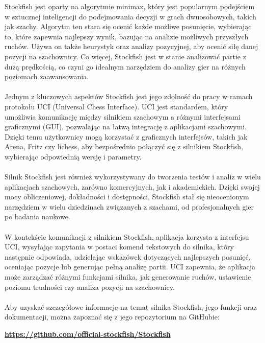 \documentclass[12pt,a4paper]{article}
\begin{document}
Stockfish jest oparty na algorytmie minimax, który jest popularnym podejściem w sztucznej inteligencji do podejmowania decyzji w grach dwuosobowych, takich jak szachy. Algorytm ten stara się ocenić każde możliwe posunięcie, wybierając to, które zapewnia najlepszy wynik, bazując na analizie możliwych przyszłych ruchów. Używa on także heurystyk oraz analizy pozycyjnej, aby ocenić siłę danej pozycji na szachownicy. Co więcej, Stockfish jest w stanie analizować partie z dużą prędkością, co czyni go idealnym narzędziem do analizy gier na różnych poziomach zaawansowania.
\\\\
Jednym z kluczowych aspektów Stockfish jest jego zdolność do pracy w ramach protokołu UCI (Universal Chess Interface). UCI jest standardem, który umożliwia komunikację między silnikiem szachowym a różnymi interfejsami graficznymi (GUI), pozwalając na łatwą integrację z aplikacjami szachowymi. Dzięki temu użytkownicy mogą korzystać z graficznych interfejsów, takich jak Arena, Fritz czy lichess, aby bezpośrednio połączyć się z silnikiem Stockfish, wybierając odpowiednią wersję i parametry.
\\\\
Silnik Stockfish jest również wykorzystywany do tworzenia testów i analiz w wielu aplikacjach szachowych, zarówno komercyjnych, jak i akademickich. Dzięki swojej mocy obliczeniowej, dokładności i dostępności, Stockfish stał się nieocenionym narzędziem w wielu dziedzinach związanych z szachami, od profesjonalnych gier po badania naukowe.
\\\\
W kontekście komunikacji z silnikiem Stockfish, aplikacja korzysta z interfejsu UCI, wysyłając zapytania w postaci komend tekstowych do silnika, który następnie odpowiada, udzielając wskazówek dotyczących najlepszych posunięć, oceniając pozycje lub generując pełną analizę partii. UCI zapewnia, że aplikacja może zarządzać różnymi funkcjami silnika, jak generowanie ruchów, ustawienie poziomu trudności czy analiza pozycji na szachownicy.
\\\\
Aby uzyskać szczegółowe informacje na temat silnika Stockfish, jego funkcji oraz dokumentacji, można zapoznać się z jego repozytorium na GitHubie: 

\begin{center}
    \textbf{\href{https://github.com/official-stockfish/Stockfish}{https://github.com/official-stockfish/Stockfish}}
\end{center}
\end{document}
